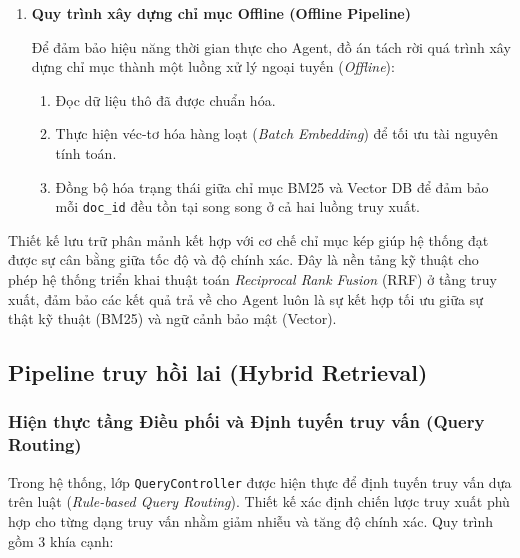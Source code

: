 \begin{enumerate}
    \item \textbf{Quy trình xây dựng chỉ mục Offline (Offline Pipeline)}

    Để đảm bảo hiệu năng thời gian thực cho Agent, đồ án tách rời quá trình xây dựng chỉ mục thành một luồng xử lý ngoại tuyến (\textit{Offline}):
    \begin{enumerate}
        \item Đọc dữ liệu thô đã được chuẩn hóa.
        \item Thực hiện véc-tơ hóa hàng loạt (\textit{Batch Embedding}) để tối ưu tài nguyên tính toán.
        \item Đồng bộ hóa trạng thái giữa chỉ mục BM25 và Vector DB để đảm bảo mỗi \texttt{doc\_id} đều tồn tại song song ở cả hai luồng truy xuất.
    \end{enumerate}
\end{enumerate}



Thiết kế lưu trữ phân mảnh kết hợp với cơ chế chỉ mục kép giúp hệ thống đạt được sự cân bằng giữa tốc độ và độ chính xác. Đây là nền tảng kỹ thuật cho phép hệ thống triển khai thuật toán \textit{Reciprocal Rank Fusion} (RRF) ở tầng truy xuất, đảm bảo các kết quả trả về cho Agent luôn là sự kết hợp tối ưu giữa sự thật kỹ thuật (BM25) và ngữ cảnh bảo mật (Vector).

\subsection{Pipeline truy hồi lai (Hybrid Retrieval)}
\label{sec:retrieval_design}
\subsubsection*{Hiện thực tầng Điều phối và Định tuyến truy vấn (Query Routing)}

Trong hệ thống, lớp \texttt{QueryController} được hiện thực để định tuyến truy vấn dựa trên luật (\textit{Rule-based Query Routing}). Thiết kế xác định chiến lược truy xuất phù hợp cho từng dạng truy vấn nhằm giảm nhiễu và tăng độ chính xác. Quy trình gồm 3 khía cạnh:

